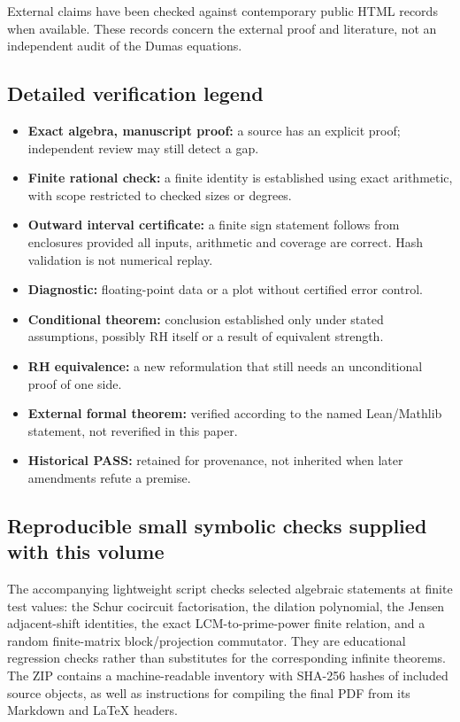 \documentclass[
  10pt,
  a4paper,
  10pt,
  oneside,
  openany]{book}
\providecommand{\tightlist}{%
  \setlength{\itemsep}{0pt}\setlength{\parskip}{0pt}}
\begin{document}
External claims have been checked against contemporary public HTML
records when available. These records concern the external proof and
literature, not an independent audit of the Dumas equations.

\subsection{Detailed verification
legend}\label{detailed-verification-legend}

\begin{itemize}
\tightlist
\item
  \textbf{Exact algebra, manuscript proof:} a source has an explicit
  proof; independent review may still detect a gap.
\item
  \textbf{Finite rational check:} a finite identity is established using
  exact arithmetic, with scope restricted to checked sizes or degrees.
\item
  \textbf{Outward interval certificate:} a finite sign statement follows
  from enclosures provided all inputs, arithmetic and coverage are
  correct. Hash validation is not numerical replay.
\item
  \textbf{Diagnostic:} floating-point data or a plot without certified
  error control.
\item
  \textbf{Conditional theorem:} conclusion established only under stated
  assumptions, possibly RH itself or a result of equivalent strength.
\item
  \textbf{RH equivalence:} a new reformulation that still needs an
  unconditional proof of one side.
\item
  \textbf{External formal theorem:} verified according to the named
  Lean/Mathlib statement, not reverified in this paper.
\item
  \textbf{Historical PASS:} retained for provenance, not inherited when
  later amendments refute a premise.
\end{itemize}

\subsection{Reproducible small symbolic checks supplied with this
volume}\label{reproducible-small-symbolic-checks-supplied-with-this-volume}

The accompanying lightweight script checks selected algebraic statements
at finite test values: the Schur cocircuit factorisation, the dilation
polynomial, the Jensen adjacent-shift identities, the exact
LCM-to-prime-power finite relation, and a random finite-matrix
block/projection commutator. They are educational regression checks
rather than substitutes for the corresponding infinite theorems. The ZIP
contains a machine-readable inventory with SHA-256 hashes of included
source objects, as well as instructions for compiling the final PDF from
its Markdown and LaTeX headers.
\end{document}

